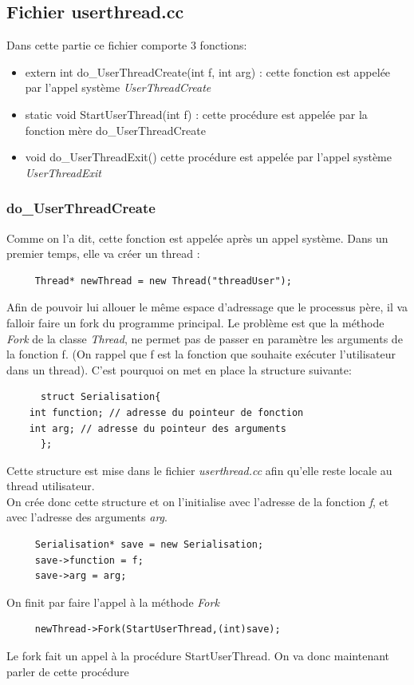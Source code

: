 \documentclass[a4paper,10pt]{article}
\begin{document}
  \subsection{Fichier userthread.cc}
    Dans cette partie ce fichier comporte 3 fonctions: 
    \begin{itemize}
     \item extern int do\_UserThreadCreate(int f, int arg) : cette fonction est appelée par l'appel système \emph{UserThreadCreate}
     \item static void StartUserThread(int f) : cette procédure est appelée par la fonction mère do\_UserThreadCreate
     \item void do\_UserThreadExit() cette procédure est appelée par l'appel système \emph{UserThreadExit}
    \end{itemize}
    
    \subsubsection*{do\_UserThreadCreate}
      Comme on l'a dit, cette fonction est appelée après un appel système. Dans un premier temps, elle va créer un thread :
	\begin{lstlisting}
	 Thread* newThread = new Thread("threadUser");
	\end{lstlisting}
     Afin de pouvoir lui allouer le même espace d'adressage que le processus père, il va falloir faire un fork du programme principal.
     Le problème est que la méthode \emph{Fork} de la classe \emph{Thread}, ne permet pas de passer en paramètre les arguments de la fonction f.
     (On rappel que f est la fonction que souhaite exécuter l'utilisateur dans un thread). C'est pourquoi on met en place la structure suivante:
     \begin{lstlisting}
      struct Serialisation{
	int function; // adresse du pointeur de fonction
	int arg; // adresse du pointeur des arguments
      };
     \end{lstlisting}
    Cette structure est mise dans le fichier \emph{userthread.cc} afin qu'elle reste locale au thread utilisateur.\\

    On crée donc cette structure et on l'initialise avec l'adresse de la fonction \emph{f}, et avec l'adresse des arguments \emph{arg}.
    \begin{lstlisting}
     Serialisation* save = new Serialisation;
     save->function = f;
     save->arg = arg;
    \end{lstlisting}
    On finit par faire l'appel à la méthode \emph{Fork}
    \begin{lstlisting}
     newThread->Fork(StartUserThread,(int)save);
    \end{lstlisting}
    Le fork fait un appel à la procédure StartUserThread. On va donc maintenant parler de cette procédure
    \newpage
\end{document}
